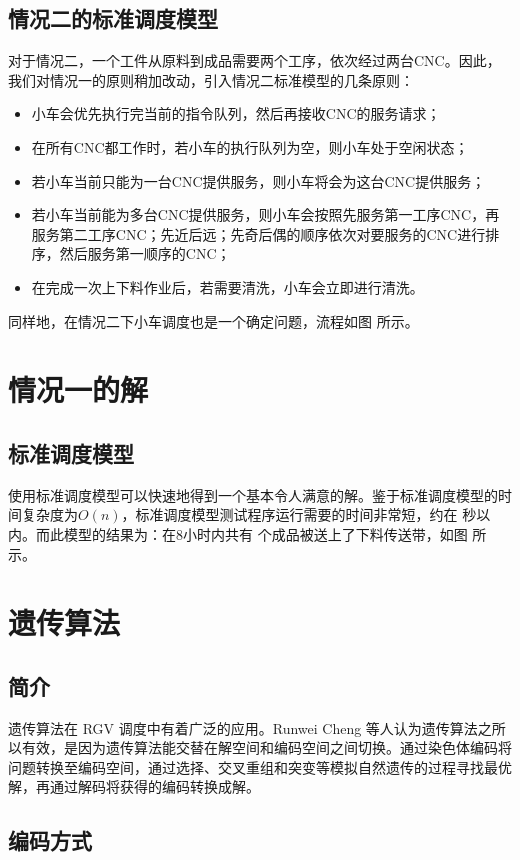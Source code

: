 \documentclass{cumcmthesis}
\begin{document}
	\subsection{情况二的标准调度模型}
	对于情况二，一个工件从原料到成品需要两个工序，依次经过两台CNC。因此，我们对情况一的原则稍加改动，引入情况二标准模型的几条原则：
	\begin{itemize}
		\item 小车会优先执行完当前的指令队列，然后再接收CNC的服务请求；
		\item 在所有CNC都工作时，若小车的执行队列为空，则小车处于空闲状态；
		\item 若小车当前只能为一台CNC提供服务，则小车将会为这台CNC提供服务；
		\item 若小车当前能为多台CNC提供服务，则小车会按照先服务第一工序CNC，再服务第二工序CNC；先近后远；先奇后偶的顺序依次对要服务的CNC进行排序，然后服务第一顺序的CNC；
		\item 在完成一次上下料作业后，若需要清洗，小车会立即进行清洗。
	\end{itemize}
	同样地，在情况二下小车调度也是一个确定问题，流程如图 所示。

	\section{情况一的解}
	\subsection{标准调度模型}
	使用标准调度模型可以快速地得到一个基本令人满意的解。鉴于标准调度模型的时间复杂度为\(O(n)\)，标准调度模型测试程序运行需要的时间非常短，约在 秒以内。而此模型的结果为：在8小时内共有 个成品被送上了下料传送带，如图 所示。
	
	\section{遗传算法}
	
	\subsection{简介}

	遗传算法在 RGV 调度中有着广泛的应用。Runwei Cheng 等人认为\cite{chenrunwei}遗传算法之所以有效，是因为遗传算法能交替在解空间和编码空间之间切换。通过染色体编码将问题转换至编码空间，通过选择、交叉重组和突变等模拟自然遗传的过程寻找最优解，再通过解码将获得的编码转换成解。

	\subsection{编码方式}
\end{document}

